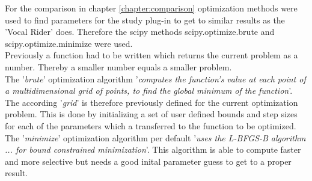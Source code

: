 For the comparison in chapter \ref{chapter:comparison} optimization methods were used to find parameters for the study plug-in to get to similar results as the 'Vocal Rider' does. Therefore the scipy\cite{scipy} methods scipy.optimize.brute and scipy.optimize.minimize were used.\\
Previously a function had to be written which returns the current problem as a number. Thereby a smaller number equals a smaller problem.\\
The '\textit{brute}' optimization algorithm '\textit{computes the function’s value at each point of a multidimensional grid of points, to find the global minimum of the function}'\cite{scipyB}. The according '\textit{grid}' is therefore previously defined for the current optimization problem. This is done by initializing a set of user defined bounds and step sizes for each of the parameters which a transferred to the function to be optimized.\\
The '\textit{minimize}' optimization algorithm per default '\textit{uses the L-BFGS-B algorithm ... for bound constrained minimization}'\cite{scipyM}. This algorithm is able to compute faster and more selective but needs a good inital parameter guess to get to a proper result.\\

